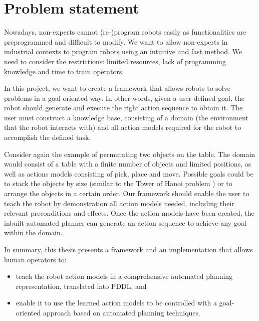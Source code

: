 \section{Problem statement}
Nowadays, non-experts cannot (re-)program robots easily as functionalities are preprogrammed and difficult to modify. 
We want to allow non-experts in industrial contexts to program robots using an intuitive and fast method.
We need to consider the restrictions: limited resources, lack of programming knowledge and time to train operators.

In this project, we want to create a framework that allows robots to solve problems in a goal-oriented way. In other words, given a user-defined goal, the robot should generate and execute the right action sequence to obtain it. The user must construct a knowledge base, consisting of a domain (the environment that the robot interacts with) and all action models required for the robot to accomplish the defined task. 

Consider again the example of permutating two objects on the table. The domain would consist of a table with a finite number of objects and limited positions, as well as actions models consisting of pick, place and move. Possible goals could be to stack the objects by size (similar to the Tower of Hanoi problem \cite{douglas1985metamagical}) or to arrange the objects in a certain order. Our framework should enable the user to teach the robot by demonstration all action models needed, including their relevant preconditions and effects. Once the action models have been created, the inbuilt automated planner can generate an action sequence to achieve any goal within the domain. 


\noindent In summary, this thesis presents a framework and an implementation that allows human operators to:

\begin{itemize}
\item teach the robot action models in a comprehensive automated planning representation, translated into PDDL, and
\item enable it to use the learned action models to be controlled with a goal-oriented approach based on automated planning techniques.
\end{itemize}

